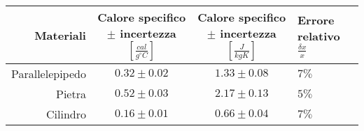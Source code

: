\documentclass[11pt]{article}
\begin{document}
\begin{longtable}[]{@{}rccl@{}}
\toprule
\begin{minipage}[b]{0.09\columnwidth}\raggedleft
Materiali\strut
\end{minipage} & \begin{minipage}[b]{0.41\columnwidth}\centering
Calore specifico \(\pm\) incertezza \([\frac{cal}{g^\circ C}]\)\strut
\end{minipage} & \begin{minipage}[b]{0.30\columnwidth}\centering
Calore specifico \(\pm\) incertezza \([\frac{J}{kgK}]\)\strut
\end{minipage} & \begin{minipage}[b]{0.09\columnwidth}\raggedright
Errore relativo \(\frac{\delta x}{x}\)\strut
\end{minipage}\tabularnewline
\midrule
\endhead
\begin{minipage}[t]{0.09\columnwidth}\raggedleft
Parallelepipedo\strut
\end{minipage} & \begin{minipage}[t]{0.41\columnwidth}\centering
\(0.32\pm0.02\)\strut
\end{minipage} & \begin{minipage}[t]{0.30\columnwidth}\centering
\(1.33 \pm 0.08\)\strut
\end{minipage} & \begin{minipage}[t]{0.09\columnwidth}\raggedright
\(7 \%\)\strut
\end{minipage}\tabularnewline
\begin{minipage}[t]{0.09\columnwidth}\raggedleft
Pietra\strut
\end{minipage} & \begin{minipage}[t]{0.41\columnwidth}\centering
\(0.52 \pm 0.03\)\strut
\end{minipage} & \begin{minipage}[t]{0.30\columnwidth}\centering
\(2.17 \pm 0.13\)\strut
\end{minipage} & \begin{minipage}[t]{0.09\columnwidth}\raggedright
\(5 \%\)\strut
\end{minipage}\tabularnewline
\begin{minipage}[t]{0.09\columnwidth}\raggedleft
Cilindro\strut
\end{minipage} & \begin{minipage}[t]{0.41\columnwidth}\centering
\(0.16 \pm 0.01\)\strut
\end{minipage} & \begin{minipage}[t]{0.30\columnwidth}\centering
\(0.66 \pm 0.04\)\strut
\end{minipage} & \begin{minipage}[t]{0.09\columnwidth}\raggedright
\(7 \%\)\strut
\end{minipage}\tabularnewline
\bottomrule
\end{longtable}
\end{document}

